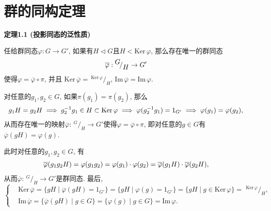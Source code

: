 \documentclass[UTF8]{ctexart}
\begin{document}
\setlength{\abovedisplayskip}{1pt}
\setlength{\belowdisplayskip}{1pt}

\section{群的同构定理}

\hypertarget{sec:定理1.1}{}
\noindent\textbf{定理1.1 (投影同态的泛性质)}

任给群同态$\varphi:G\to G'$, 如果有$H\lhd G$且$H<\mathrm{Ker}\,\varphi$,
那么存在唯一的群同态
\vspace{3pt}
\[
    \overline{\varphi}:\,\!^{\displaystyle G}\!/_{\displaystyle H}\to G'\\[3pt]
\]
使得$\varphi=\overline{\varphi}\circ\pi$, 并且
$\mathrm{Ker}\,\overline{\varphi}=
\,\!^{\displaystyle\mathrm{Ker}\,\varphi}\!/_{\displaystyle H}$,
$\mathrm{Im}\,\overline{\varphi}=\mathrm{Im}\,\varphi$.


对任意的$g_1,g_2\in G$, 如果$\pi(g_1)=\pi(g_2)$, 那么
\vspace{3pt}
\[
    g_1H=g_2H\implies g_2^{-1}g_1\in H\subset\mathrm{Ker}\,\varphi\implies
    \varphi(g_2^{-1}g_1)=1_{G'}\implies\varphi(g_1)=\varphi(g_2),\\[3pt]
\]
从而存在唯一的映射$\overline{\varphi}:\,\!^{\displaystyle G}\!/_{\displaystyle H}
\to G'$使得$\varphi=\overline{\varphi}\circ\pi$, 即对任意的$g\in G$有
$\overline{\varphi}(gH)=\varphi(g)$.

此时对任意的$g_1,g_2\in G$, 有
\[
    \overline{\varphi}(g_1g_2H)=\varphi(g_1g_2)=\varphi(g_1)\cdot\varphi(g_2)=
    \overline{\varphi}(g_1H)\cdot\overline{\varphi}(g_2H),\\[3pt]
\]
从而$\overline{\varphi}:\,\!^{\displaystyle G}\!/_{\displaystyle H}
\to G'$是群同态. 最后,
\vspace{5pt}
\begin{equation*}\left\{\begin{aligned}
    &\mathrm{Ker}\,\overline{\varphi}=\{gH\mid\overline{\varphi}(gH)=1_{G'}\}=
    \{gH\mid\varphi(g)=1_{G'}\}=\{gH\mid g\in\mathrm{Ker}\,\varphi\}=\,
    \,\!^{\displaystyle\mathrm{Ker}\,\varphi}\!/_{\displaystyle H},\\[3pt]
    &\mathrm{Im}\,\overline{\varphi}=\{\overline{\varphi}(gH)\mid g\in G\}=
    \{\varphi(g)\mid g\in G\}=\mathrm{Im}\,\varphi.
\end{aligned}\right.\tag*{\qedsymbol}\end{equation*}
\end{document}
